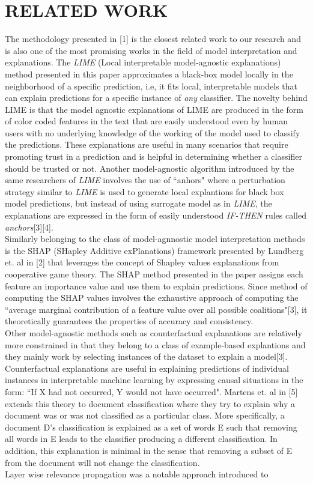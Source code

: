 \documentclass[letterpaper, 10 pt, conference]{ieeeconf}  %
\begin{document}
\section{RELATED WORK}
The methodology presented in [1] is the closest related work to our research and is also one of the most promising works in the field of model interpretation and explanations. The \textit{LIME} (Local interpretable model-agnostic explanations) method presented in this paper approximates a black-box model locally in the neighborhood of a specific prediction, i.e, it fits local, interpretable models that can explain predictions for a specific instance of \textit{any} classifier. The novelty behind LIME is that the model agnostic explanations of LIME are produced in the form of color coded features in the text that are easily understood even by human users with no underlying knowledge of the working of the model used to classify the predictions. These explanations are useful in many scenarios that require promoting trust in a prediction and is helpful in determining whether a classifier should be trusted or not. Another model-agnostic algorithm introduced by the same researchers of \textit{LIME} involves the use of ``anhors" where a perturbation strategy similar to \textit{LIME} is used to generate local explantions for black box model predictions, but instead of using surrogate model as in \textit{LIME}, the explanations are expressed in the form of easily understood \textit{IF-THEN} rules called \textit{anchors}[3][4]. \\Similarly belonging to the class of model-agnnostic model interpretation methods is the SHAP (SHapley Additive exPlanations) framework presented by Lundberg et. al in [2] that leverages the concept of Shapley values explanations from cooperative game theory. The SHAP method presented in the paper assigns each feature an importance value and use them to explain predictions. Since method of computing the SHAP values involves the exhaustive approach of computing the ``average marginal contribution of a feature value over all possible coalitions"[3], it theoretically guarantees the properties of accuracy and consistency.\\Other model-agnostic methods such as counterfactual explanations are relatively more constrained in that they belong to a class of example-based explantions and they mainly work by selecting instances of the dataset to explain a model[3]. Counterfactual explanations are useful in explaining predictions of individual instances in interpretable machine learning by expressing causal situations in the form: ``If X had not occurred, Y would not have occurred". Martens et. al in [5] extends this theory to document classification where they try to explain why a document was or was not classified as a particular class. More specifically, a document D's classification is explained as a set of words E such that removing all words in E leads to the classifier producing a different classification. In addition, this explanation is minimal in the sense that removing a subset of E from the document will not change the classification.\\Layer wise relevance propagation was a notable approach introduced to 
\end{document}
